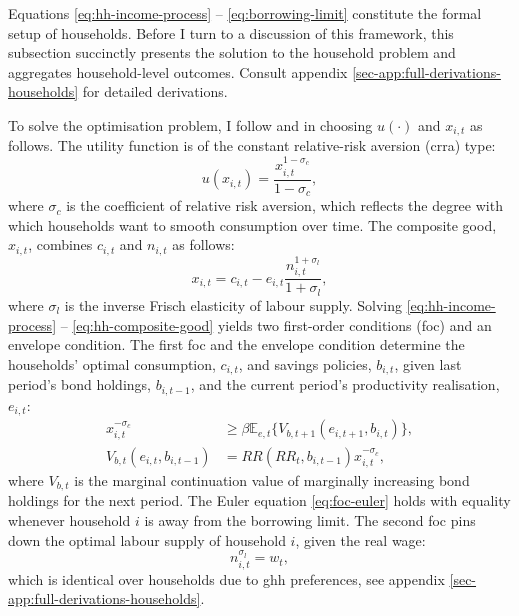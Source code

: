 \documentclass[a4paper,12pt]{article} %
\numberwithin{equation}{section} %
\numberwithin{figure}{section}
\numberwithin{table}{section}
\begin{document}
Equations \eqref{eq:hh-income-process} -- \eqref{eq:borrowing-limit} constitute the formal setup of households. Before I turn to a discussion of this framework, this subsection succinctly presents the solution to the household problem and aggregates household-level outcomes. Consult appendix \ref{sec-app:full-derivations-households} for detailed derivations.

To solve the optimisation problem, I follow \textcite{boehl2023econpizza} and \textcite{bayer2023} in choosing $u( \cdot )$ and $x_{i,t}$ as follows. The utility function is of the constant relative-risk aversion (\Gls{crra}) type:
\begin{equation}
    u(x_{i,t}) = \frac{x_{i,t}^{1-\sigma_c}}{1-\sigma_c}, \label{eq:hh-utility-fun}
\end{equation}
where $\sigma_c$ is the coefficient of relative risk aversion, which reflects the degree with which households want to smooth consumption over time. The composite good, $x_{i,t}$, combines $c_{i,t}$ and $n_{i,t}$ as follows:
\begin{equation}
    x_{i,t} = c_{i,t} - e_{i,t}\frac{n_{i,t}^{1+\sigma_l}}{1+\sigma_l},
    \label{eq:hh-composite-good}
\end{equation}
where $\sigma_l$ is the inverse Frisch elasticity of labour supply. Solving \eqref{eq:hh-income-process} -- \eqref{eq:hh-composite-good} yields two first-order conditions (\Gls{foc}) and an envelope condition. The first \Gls{foc} and the envelope condition determine the households' optimal consumption, $c_{i,t}$, and savings policies, $b_{i,t}$, given last period's bond holdings, $b_{i,t-1}$, and the current period's productivity realisation, $e_{i,t}$:
\begin{align}
    x_{i,t}^{-\sigma_c} &\ge \beta \mathbb{E}_{e,t} \{ V_{b,t+1} (e_{i,t+1}, b_{i,t}) \}, \label{eq:foc-euler} \\
    V_{b,t} (e_{i,t}, b_{i,t-1}) &= RR (RR_t, b_{i,t-1}) x_{i,t}^{-\sigma_c}, \label{eq:foc-envelope} 
\end{align}
where $V_{b,t}$ is the marginal continuation value of marginally increasing bond holdings for the next period. The Euler equation \eqref{eq:foc-euler} holds with equality whenever household $i$ is away from the borrowing limit. The second \Gls{foc} pins down the optimal labour supply of household $i$, given the real wage:
\begin{equation}
n_{i,t}^{\sigma_l} = w_t, \label{eq:foc-labour-supply}
\end{equation}
which is identical over households due to \Gls{ghh} preferences, see appendix \ref{sec-app:full-derivations-households}.
\end{document}
